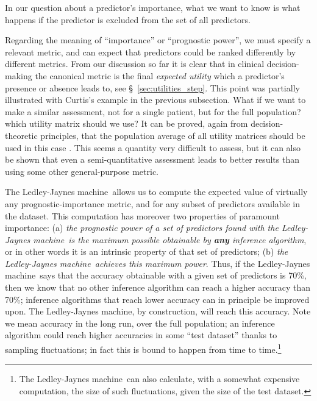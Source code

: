\documentclass[utf8]{FrontiersinHarvard} %
\newcommand*{\sect}{\S}%
\newcommand*{\cf}{{cf.}}
\renewcommand*{\|}[1][]{\nonscript\:#1\vert\nonscript\:\mathopen{}}
\newcommand*{\ljm}{Ledley-Jaynes machine}
\begin{document}
In our question about a predictor's importance, what we want to know is what happens if the predictor is excluded from the set of all predictors.

Regarding the meaning of \enquote{importance} or \enquote{prognostic power}, we must specify a relevant metric, and can expect that predictors could be ranked differently by different metrics. From our discussion so far it is clear that in clinical decision-making the canonical metric is the final \emph{expected utility} which a predictor's presence or absence leads to, see \sect~\ref{sec:utilities_step}. This point was partially illustrated with Curtis's example in the previous subsection. What if we want to make a similar assessment, not for a single patient, but for the full population? which utility matrix should we use? It can be proved, again from decision-theoretic principles, that the population average of all utility matrices should be used in this case \citep[\cf][\sect~4.1]{dyrlandetal2022}. This seems a quantity very difficult to assess, but it can also be shown \citep[\sect~4.2]{dyrlandetal2022} that even a semi-quantitative assessment leads to better results than using some other general-purpose metric.

The \ljm\ allows us to compute the expected value of virtually any prognostic-importance metric, and for any subset of predictors available in the dataset. This computation has moreover two properties of paramount importance: (a) \emph{the prognostic power of a set of predictors found with the \ljm\ is the maximum possible obtainable by \textbf{any} inference algorithm}, or in other words it is an intrinsic property of that set of predictors; (b) \emph{the \ljm\ achieves this maximum power}. Thus, if the \ljm\ says that the accuracy obtainable with a given set of predictors is 70\%, then we know that no other inference algorithm can reach a higher accuracy than 70\%; inference algorithms that reach lower accuracy can in principle be improved upon. The \ljm, by construction, will reach this accuracy. Note we mean accuracy in the long run, over the full population; an inference algorithm could reach higher accuracies in some \enquote{test dataset} thanks to sampling fluctuations; in fact this is bound to happen from time to time.\footnote{The \ljm\ can also calculate, with a somewhat expensive computation, the size of such fluctuations, given the size of the test dataset.}
\end{document}
